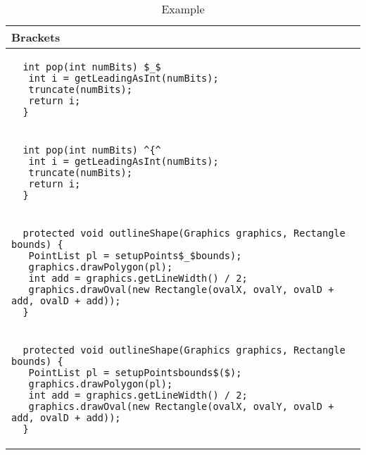 \begin{table}[p]
\begin{tabular}{ | m{11cm} | }
  \hline
  Brackets \\
  \hline
  \begin{lstlisting}
  int pop(int numBits) $_$
   int i = getLeadingAsInt(numBits);
   truncate(numBits);
   return i;
  }
  \end{lstlisting} \\
  \begin{lstlisting}
  int pop(int numBits) ^{^
   int i = getLeadingAsInt(numBits);
   truncate(numBits);
   return i;
  }
  \end{lstlisting} \\
  \hline
  \hline
  \begin{lstlisting}
  protected void outlineShape(Graphics graphics, Rectangle bounds) {
   PointList pl = setupPoints$_$bounds);
   graphics.drawPolygon(pl);
   int add = graphics.getLineWidth() / 2;
   graphics.drawOval(new Rectangle(ovalX, ovalY, ovalD + add, ovalD + add));
  }
  \end{lstlisting} \\
  \begin{lstlisting}
  protected void outlineShape(Graphics graphics, Rectangle bounds) {
   PointList pl = setupPointsbounds$($);
   graphics.drawPolygon(pl);
   int add = graphics.getLineWidth() / 2;
   graphics.drawOval(new Rectangle(ovalX, ovalY, ovalD + add, ovalD + add));
  }
  \end{lstlisting} \\
  \hline
\end{tabular}
\caption{Example}
\label{brackets_showcase_table}
\end{table}

